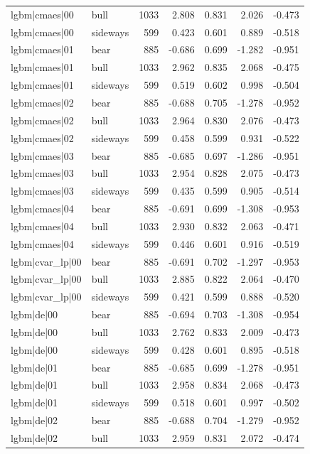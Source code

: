 \begin{table}
\begin{tabular}{llrrrrr}
lgbm|cmaes|00 & bull & 1033 & 2.808 & 0.831 & 2.026 & -0.473 \\
lgbm|cmaes|00 & sideways & 599 & 0.423 & 0.601 & 0.889 & -0.518 \\
lgbm|cmaes|01 & bear & 885 & -0.686 & 0.699 & -1.282 & -0.951 \\
lgbm|cmaes|01 & bull & 1033 & 2.962 & 0.835 & 2.068 & -0.475 \\
lgbm|cmaes|01 & sideways & 599 & 0.519 & 0.602 & 0.998 & -0.504 \\
lgbm|cmaes|02 & bear & 885 & -0.688 & 0.705 & -1.278 & -0.952 \\
lgbm|cmaes|02 & bull & 1033 & 2.964 & 0.830 & 2.076 & -0.473 \\
lgbm|cmaes|02 & sideways & 599 & 0.458 & 0.599 & 0.931 & -0.522 \\
lgbm|cmaes|03 & bear & 885 & -0.685 & 0.697 & -1.286 & -0.951 \\
lgbm|cmaes|03 & bull & 1033 & 2.954 & 0.828 & 2.075 & -0.473 \\
lgbm|cmaes|03 & sideways & 599 & 0.435 & 0.599 & 0.905 & -0.514 \\
lgbm|cmaes|04 & bear & 885 & -0.691 & 0.699 & -1.308 & -0.953 \\
lgbm|cmaes|04 & bull & 1033 & 2.930 & 0.832 & 2.063 & -0.471 \\
lgbm|cmaes|04 & sideways & 599 & 0.446 & 0.601 & 0.916 & -0.519 \\
lgbm|cvar\_lp|00 & bear & 885 & -0.691 & 0.702 & -1.297 & -0.953 \\
lgbm|cvar\_lp|00 & bull & 1033 & 2.885 & 0.822 & 2.064 & -0.470 \\
lgbm|cvar\_lp|00 & sideways & 599 & 0.421 & 0.599 & 0.888 & -0.520 \\
lgbm|de|00 & bear & 885 & -0.694 & 0.703 & -1.308 & -0.954 \\
lgbm|de|00 & bull & 1033 & 2.762 & 0.833 & 2.009 & -0.473 \\
lgbm|de|00 & sideways & 599 & 0.428 & 0.601 & 0.895 & -0.518 \\
lgbm|de|01 & bear & 885 & -0.685 & 0.699 & -1.278 & -0.951 \\
lgbm|de|01 & bull & 1033 & 2.958 & 0.834 & 2.068 & -0.473 \\
lgbm|de|01 & sideways & 599 & 0.518 & 0.601 & 0.997 & -0.502 \\
lgbm|de|02 & bear & 885 & -0.688 & 0.704 & -1.279 & -0.952 \\
lgbm|de|02 & bull & 1033 & 2.959 & 0.831 & 2.072 & -0.474 \\

\end{tabular}
\end{table}
